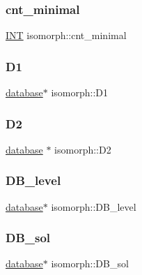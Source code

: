 \subsubsection{\texorpdfstring{cnt\+\_\+minimal}{cnt\_minimal}}
{\footnotesize\ttfamily \mbox{\hyperlink{galois_8h_a09fddde158a3a20bd2dcadb609de11dc}{I\+NT}} isomorph\+::cnt\+\_\+minimal}

\mbox{\label{classisomorph_afefcecac0bf7c6ea7e730db7b147b226}} 
\subsubsection{\texorpdfstring{D1}{D1}}
{\footnotesize\ttfamily \mbox{\hyperlink{classdatabase}{database}}$\ast$ isomorph\+::\+D1}

\mbox{\label{classisomorph_a075bc2cddf1e832214cecdf74b3c8409}} 
\subsubsection{\texorpdfstring{D2}{D2}}
{\footnotesize\ttfamily \mbox{\hyperlink{classdatabase}{database}} $\ast$ isomorph\+::\+D2}

\mbox{\label{classisomorph_af23accba6a3b7db287fcd282016569d0}} 
\subsubsection{\texorpdfstring{D\+B\+\_\+level}{DB\_level}}
{\footnotesize\ttfamily \mbox{\hyperlink{classdatabase}{database}}$\ast$ isomorph\+::\+D\+B\+\_\+level}

\mbox{\label{classisomorph_a31d2be5122fd47d8950b7efe90ade02f}} 
\subsubsection{\texorpdfstring{D\+B\+\_\+sol}{DB\_sol}}
{\footnotesize\ttfamily \mbox{\hyperlink{classdatabase}{database}}$\ast$ isomorph\+::\+D\+B\+\_\+sol}

